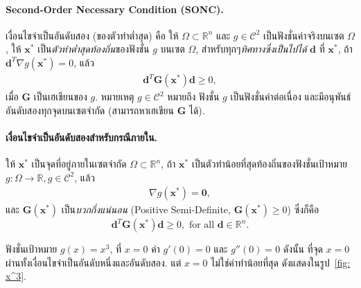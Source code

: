 \paragraph{Second-Order Necessary Condition (SONC).} เงื่อนไขจำเป็นอันดับสอง (ของตัวทำต่ำสุด) คือ
ให้ $\Omega \subset \mathbb{R}^n$ และ $g \in \mathcal{C}^2$ เป็นฟังชั่นค่าจริงบนเซต $\Omega$,
ให้ $\mathbf{x}^*$ เป็น\textit{ตัวทำต่ำสุดท้องถิ่น}ของฟังชั่น $g$ บนเซต $\Omega$, สำหรับทุกๆ\textit{ทิศทางซึ่งเป็นไปได้} $\mathbf{d}$ ที่ $\mathbf{x}^*$, 
ถ้า $\mathbf{d}^T \nabla g(\mathbf{x}^*) = 0$, แล้ว
\begin{eqnarray}
   \mathbf{d}^T \mathbf{G}(\mathbf{x}^*) \mathbf{d} \geq 0,
\label{eq: SONC}
\end{eqnarray}
เมื่อ $\mathbf{G}$ เป็นเฮเชียนของ $g$.
หมายเหตุ $g \in \mathcal{C}^2$ หมายถึง ฟังชั่น $g$ เป็นฟังชั่นค่าต่อเนื่อง และมีอนุพันธ์อันดับสองทุกจุดบนเซตจำกัด (สามารถหาเฮเชียน $\mathbf{G}$ ได้).

\paragraph{เงื่อนไขจำเป็นอันดับสองสำหรับกรณีภายใน.} %
ให้ $\mathbf{x}^*$ เป็นจุดที่อยู่ภายในเซตจำกัด $\Omega \subset \mathbb{R}^n$, ถ้า $\mathbf{x}^*$ เป็นตัวทำน้อยที่สุดท้องถิ่นของฟังชั่นเป้าหมาย $g: \Omega \to \mathbb{R}, g \in \mathcal{C}^2$, แล้ว
\begin{eqnarray}
   \nabla g(\mathbf{x}^*) = \mathbf{0},
\nonumber   
\end{eqnarray}
และ $\mathbf{G}(\mathbf{x}^*)$ เป็น\textit{บวกกึ่งแน่นอน} (Positive Semi-Definite, $\mathbf{G}(\mathbf{x}^*) \geq 0$) ซึ่งก็คือ
\begin{equation}
   \mathbf{d}^T \mathbf{G}(\mathbf{x}^*) \mathbf{d} \geq 0,
   \mbox{ for all } \mathbf{d} \in \mathbb{R}^n.   
\nonumber   
\end{equation}

\begin{myexample}
ฟังชั่นเป้าหมาย $g(x) = x^3$, ที่ $x = 0$ ค่า $g'(0) = 0$ และ $g''(0) = 0$ ดังนั้น ที่จุด $x = 0$ ผ่านทั้งเงื่อนไขจำเป็นอันดับหนึ่งและอันดับสอง.
แต่ $x=0$ ไม่ใช่ค่าทำน้อยที่สุด ดังแสดงในรูป~\ref{fig: x^3}.
\end{myexample}

